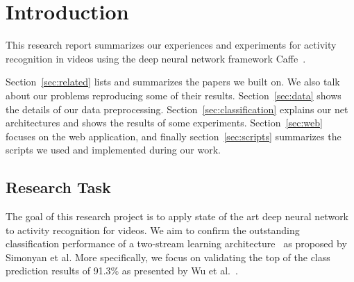 \section{Introduction}
\label{sec:introduction}

This research report summarizes our experiences and experiments for activity recognition in videos using the deep neural network framework Caffe~\cite{jia2014caffe}.

Section~\ref{sec:related} lists and summarizes the papers we built on.
We also talk about our problems reproducing some of their results.
Section~\ref{sec:data} shows the details of our data preprocessing.
Section~\ref{sec:classification} explains our net architectures and shows the results of some experiments.
Section~\ref{sec:web} focuses on the web application, and finally section~\ref{sec:scripts} summarizes the scripts we used and implemented during our work.

\subsection{Research Task}
The goal of this research project is to apply state of the art deep neural network to activity recognition for videos.
We aim to confirm the outstanding classification performance of a two-stream learning architecture~\cite{simonyan2014two} as proposed by Simonyan et al.
More specifically, we focus on validating the top of the class prediction results of 91.3\% as presented by Wu et al.~\cite{wu2015modeling}.
